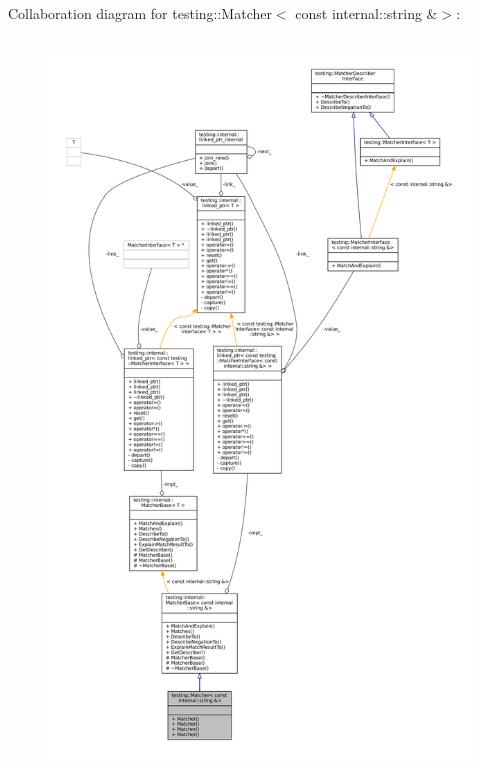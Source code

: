 Collaboration diagram for testing\+:\+:Matcher$<$ const internal\+:\+:string \&$>$\+:
\nopagebreak
\begin{figure}[H]
\begin{center}
\leavevmode
\includegraphics[height=550pt]{classtesting_1_1Matcher_3_01const_01internal_1_1string_01_6_4__coll__graph}
\end{center}
\end{figure}
